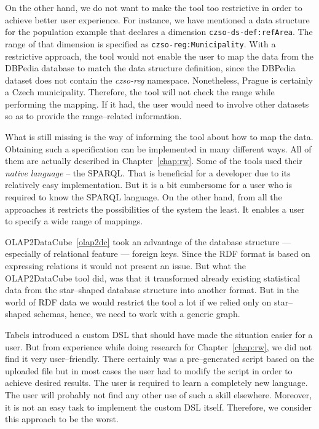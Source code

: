 On the other hand, we do not want to make the tool too restrictive in order to 
achieve better user experience. For instance, we have mentioned a data structure 
for the population example that declares a dimension \texttt{czso-ds-def:refArea}. 
The range of that dimension is specified as \texttt{czso-reg:Municipality}. 
With a restrictive approach, the tool would not enable the user to map the data from 
the DBPedia database to match the data structure definition, since the DBPedia 
dataset does not contain the \emph{czso-reg} namespace. Nonetheless, Prague is 
certainly a Czech municipality. Therefore, the tool will not check the range 
while performing the mapping. If it had, the user would need to involve 
other datasets so as to provide the range--related information.

What is still missing is the way of informing the tool about how to map the data.
Obtaining such a specification can be implemented in many different ways. 
All of them are actually described in Chapter~\ref{chap:rw}. Some of the tools used 
their \emph{native language} -- the SPARQL. That is beneficial for a developer due to 
its relatively easy implementation. But it is a bit cumbersome for a user 
who is required to know the SPARQL language. On the other hand, from all the approaches
it restricts the possibilities of the system the least. It enables a user 
to specify a wide range of mappings.

OLAP2DataCube~\ref{olap2dc} took an advantage of the database structure --- 
especially of relational feature --- foreign keys. Since the RDF format 
is based on expressing relations it would not present an issue. But what the 
OLAP2DataCube tool did, was that it transformed already existing statistical data from
the star--shaped database structure into another format. But in the world of RDF 
data we would restrict the tool a lot if we relied only on star--shaped 
schemas, hence, we need to work with a generic graph.

Tabels introduced a custom DSL that should have made the situation easier for 
a user. But from experience while doing research for Chapter~\ref{chap:rw}, 
we did not find it very user--friendly. There certainly was a pre--generated script based
on the uploaded file but in most cases the user had to modify the script in order to
achieve desired results. The user is required to learn a 
completely new language. The user will probably not find any other use of such a skill
elsewhere. Moreover, it is not an easy task to implement the 
custom DSL itself. Therefore, we consider this approach to be the worst.

